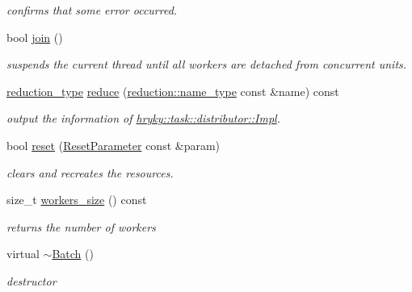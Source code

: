 \begin{DoxyCompactItemize}
\begin{DoxyCompactList}\small\item\em confirms that some error occurred. \end{DoxyCompactList}\item 
bool \hyperlink{classhryky_1_1task_1_1distributor_1_1_base_a15a4600d30363d1393a68ec3d1ec415e}{join} ()
\begin{DoxyCompactList}\small\item\em suspends the current thread until all workers are detached from concurrent units. \end{DoxyCompactList}\item 
\hypertarget{group__task_ga0170ebe627b3f2a67912e5b237994b9d}{\hyperlink{namespacehryky_a343a9a4c36a586be5c2693156200eadc}{reduction\-\_\-type} \hyperlink{group__task_ga0170ebe627b3f2a67912e5b237994b9d}{reduce} (\hyperlink{namespacehryky_1_1reduction_ac686c30a4c8d196bbd0f05629a6b921f}{reduction\-::name\-\_\-type} const \&name) const}\label{group__task_ga0170ebe627b3f2a67912e5b237994b9d}

\begin{DoxyCompactList}\small\item\em output the information of \hyperlink{classhryky_1_1task_1_1distributor_1_1_impl}{hryky\-::task\-::distributor\-::\-Impl}. \end{DoxyCompactList}\item 
bool \hyperlink{group__task_ga9ebf9038e6e40f583b3b26866e1f8131}{reset} (\hyperlink{structhryky_1_1task_1_1distributor_1_1_base_1_1_reset_parameter}{Reset\-Parameter} const \&param)
\begin{DoxyCompactList}\small\item\em clears and recreates the resources. \end{DoxyCompactList}\item 
\hypertarget{classhryky_1_1task_1_1distributor_1_1_base_adfb7b94cdf47e1bdd4f1775bb3264602}{size\-\_\-t \hyperlink{classhryky_1_1task_1_1distributor_1_1_base_adfb7b94cdf47e1bdd4f1775bb3264602}{workers\-\_\-size} () const }\label{classhryky_1_1task_1_1distributor_1_1_base_adfb7b94cdf47e1bdd4f1775bb3264602}

\begin{DoxyCompactList}\small\item\em returns the number of workers \end{DoxyCompactList}\item 
virtual \hyperlink{group__task_ga80bd5c0c04972878c21bd5eda4c7d4e7}{$\sim$\-Batch} ()
\begin{DoxyCompactList}\small\item\em destructor \end{DoxyCompactList}\end{DoxyCompactItemize}
